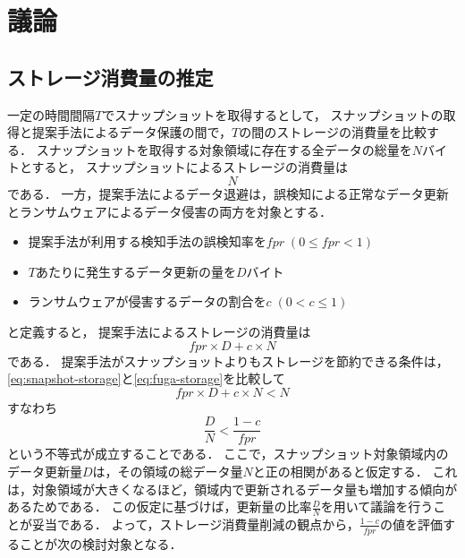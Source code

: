 \chapter{議論}
\label{chap:discussion}

\section{ストレージ消費量の推定}
一定の時間間隔$T$でスナップショットを取得するとして，
スナップショットの取得と提案手法によるデータ保護の間で，$T$の間のストレージの消費量を比較する．
スナップショットを取得する対象領域に存在する全データの総量を$N$バイトとすると，
スナップショットによるストレージの消費量は
\begin{equation}
  \label{eq:snapshot-storage}
  N
\end{equation}
である．
一方，提案手法によるデータ退避は，誤検知による正常なデータ更新とランサムウェアによるデータ侵害の両方を対象とする．
\begin{itemize}
  \item 提案手法が利用する検知手法の誤検知率を$fpr \;(0 \le fpr < 1)$
  \item $T$あたりに発生するデータ更新の量を$D$バイト
  \item ランサムウェアが侵害するデータの割合を$c \; (0 < c \le 1)$
\end{itemize}
と定義すると，
提案手法によるストレージの消費量は
\begin{equation}
  \label{eq:fuga-storage}
  fpr \times D + c \times N
\end{equation}
である．
提案手法がスナップショットよりもストレージを節約できる条件は，\eqref{eq:snapshot-storage}と\eqref{eq:fuga-storage}を比較して
\begin{equation}
  fpr \times D + c \times N < N
\end{equation}
すなわち
\begin{equation}
  \label{eq:storage-compare}
  \frac{D}{N} < \frac{1-c}{fpr}
\end{equation}
という不等式が成立することである．
ここで，スナップショット対象領域内のデータ更新量$D$は，その領域の総データ量$N$と正の相関があると仮定する．
これは，対象領域が大きくなるほど，領域内で更新されるデータ量も増加する傾向があるためである．
この仮定に基づけば，更新量の比率$\frac{D}{N}$を用いて議論を行うことが妥当である．
よって，ストレージ消費量削減の観点から，$\frac{1-c}{fpr}$の値を評価することが次の検討対象となる．



